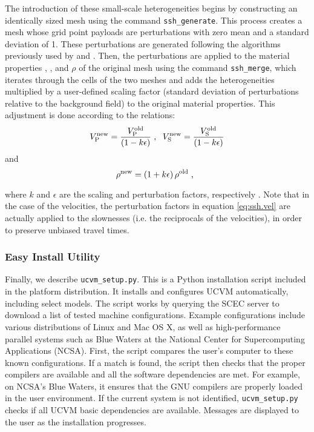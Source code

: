 The introduction of these small-scale heterogeneities begins by constructing an identically sized mesh using the command \texttt{ssh\_generate}. This process creates a mesh whose grid point payloads are perturbations with zero mean and a standard deviation of 1. These perturbations are generated following the algorithms previously used by \citet{Withers_2013_SCEC} and \citet{Savran_2014_SSA}. Then, the perturbations are applied to the material properties \vp{}, \vs{}, and $\rho$ of the original mesh using the command \texttt{ssh\_merge}, which iterates through the cells of the two meshes and adds the heterogeneities multiplied by a user-defined scaling factor (standard deviation of perturbations relative to the background field) to the original material properties. This adjustment is done according to the relations:
\begin{equation}
\label{eq:ssh.vel}
V_{\mathrm{P}}^{\mathrm{new}} = \frac{ V_{\mathrm{P}}^{\mathrm{old}} }{ (1 - k \epsilon) }
	\hspace{0.3em},
	\hspace{0.6em}
V_{\mathrm{S}}^{\mathrm{new}} = \frac{ V_{\mathrm{S}}^{\mathrm{old}} }{ (1 - k \epsilon) }
\end{equation}
and
\begin{equation}
\label{eq:ssh.density}
\rho^{\mathrm{new}} = (1 + k \epsilon) \, \rho^{\mathrm{old}}
	\hspace{0.3em},
	\hspace{0.6em}
\end{equation}

where $k$ and $\epsilon$ are the scaling and perturbation factors, respectively \citep[see][]{Withers_2013_SCEC, Savran_2014_SSA}. Note that in the case of the velocities, the perturbation factors in equation \eqref{eq:ssh.vel} are actually applied to the slownesses (i.e. the reciprocals of the velocities), in order to preserve unbiased travel times.

\subsubsection{Easy Install Utility}
\label{sec:easy.install}

Finally, we describe \texttt{ucvm\_setup.py}. This is a Python installation script included in the platform distribution. It installs and configures UCVM automatically, including select models. The script works by querying the SCEC server to download a list of tested machine configurations. Example configurations include various distributions of Linux and Mac OS X, as well as high-performance parallel systems such as Blue Waters at the National Center for Supercomputing Applications (NCSA). First, the script compares the user's computer to these known configurations. If a match is found, the script then checks that the proper compilers are available and all the software dependencies are met. For example, on NCSA's Blue Waters, it ensures that the GNU compilers are properly loaded in the user environment. If the current system is not identified, \texttt{ucvm\_setup.py} checks if all UCVM basic dependencies are available. Messages are displayed to the user as the installation progresses.

